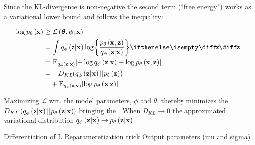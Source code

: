 Since the KL-divergence is non-negative the second term (``free energy'') works as a variational lower bound and follows the inequality:

\begin{gather}
	\begin{split}
		\log \dec{\vec{x}} & \ge \mathcal{L}\left(\vec{\theta},\vec{\phi};\vec{x}\right)
		\\ & =
		\int \enc{\vec{z}|\vec{x}} \log \curlies*{ \frac{\dec{\vec{x},\vec{z}}}{\enc{\vec{z}|\vec{x}} } } \D{\vec{z}} \\ 
		& = \E_{\enc{\vec{z}|\vec{x}}} \brackets{- \log \enc{\vec{z}|\vec{x}} + \log \dec{\vec{x},\vec{z}} } 
		\\
		& = -D_{KL}\parens{ \enc{\vec{z}|\vec{x}}||\dec{\vec{z}} } 
		\\ 
		& \quad+ \E_{\enc{\vec{z}|\vec{x}}} \brackets{\log \dec{\vec{x}|\vec{z}} }   	
	\end{split} 
\end{gather}

Maximizing $\mathcal{L}$ wrt. the model parameters, $\phi$ and $\theta$, thereby minimizes the $D_{KL}\left( q_{\phi}\left(\bm{\mathrm{z}}|\bm{\mathrm{x}}\right)||p_{\theta}\left(\bm{\mathrm{z}}|\bm{\mathrm{x}}\right)\right)$ bringing the . When $D_{KL}\rightarrow 0$ the approximated variational distribution $q_{\phi}\left(\bm{\mathrm{z}}|\bm{\mathrm{x}}\right)\rightarrow p_{\theta}\left(\bm{\mathrm{z}}|\bm{\mathrm{x}}\right)$

Differentiation of L
Reparameretization trick
Output parameters (mu and sigma)


